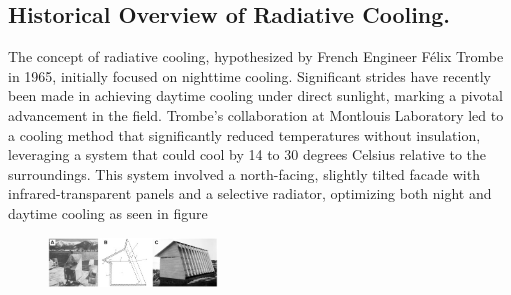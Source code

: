\subsection{Historical Overview of Radiative Cooling.}
The concept of radiative cooling, hypothesized by French Engineer Félix Trombe in 1965, initially focused on nighttime cooling. Significant strides have recently been made in achieving daytime cooling under direct sunlight, marking a pivotal advancement in the field. Trombe's collaboration at Montlouis Laboratory led to a cooling method that significantly reduced temperatures without insulation, leveraging a system that could cool by 14 to 30 degrees Celsius relative to the surroundings. This system involved a north-facing, slightly tilted facade with infrared-transparent panels and a selective radiator, optimizing both night and daytime cooling as seen in figure %
\begin{figure}[ht!]
  \centering
  \includegraphics[width=0.4\textwidth]{Chapters/Figures/Trombe PDRC Structure.png}
\end{figure}


